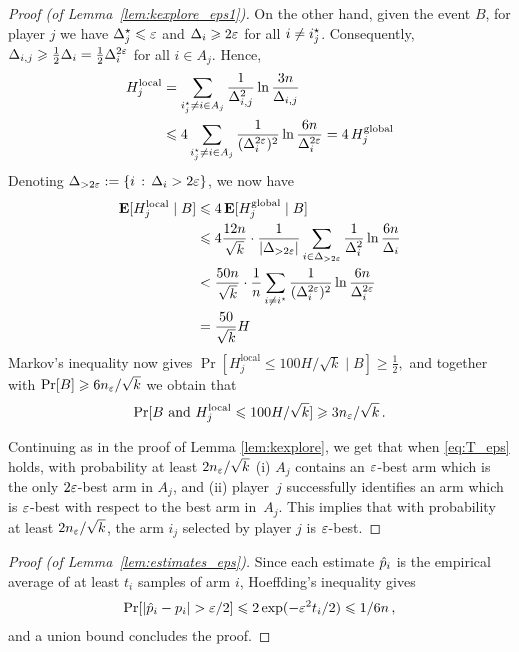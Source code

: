 \documentclass{article}
\begin{document}
\begin{proof}[Proof (of Lemma~\ref{lem:kexplore_eps1})]
On the other hand, given the event $B$, for player $j$ we have $\Delta_j^\star \leqslant \varepsilon$ and $\Delta_i \geqslant 2\varepsilon$ for all $i \ne i_j^\star$.
Consequently, $\Delta_{i,j} \geqslant \tfrac{1}{2} \Delta_i =  \tfrac{1}{2} \Delta_i^{2\varepsilon}$ for all $i \in A_j$.
Hence,
\begin{align*}
	H_j^\text{local}
	&= \sum_{i^\star_j \ne i \in A_j} \frac{1}{\Delta_{i,j}^2} \ln \frac{3n}{\Delta_{i,j}} \\
	&\leqslant 4 \sum_{i^\star_j \ne i \in A_j} \frac{1}{(\Delta_i^{2\varepsilon})^2} \ln \frac{6n}{\Delta_i^{2\varepsilon}}
	= 4 \, H_j^\text{global}
\end{align*}
Denoting $\Delta_{> 2\varepsilon} := \{i \,:\, \Delta_i > 2\varepsilon\}$, we now have 
\begin{align*}
	\mathbf{E}[H_j^\text{local} \mid B]
	&\leqslant 4 \, \mathbf{E}[H_j^\text{global} \mid B] \\
	&\leqslant 4 \frac{12n}{\sqrt{k}} \cdot 
		\frac{1}{|\Delta_{>2\varepsilon}|} 
			\sum_{i \in \Delta_{>2\varepsilon}} \frac{1}{\Delta_i^2} \ln \frac{6n}{\Delta_i} \\
	&< \frac{50n}{\sqrt{k}} \cdot 
		\frac{1}{n} \sum_{i \ne i^\star} \frac{1}{(\Delta_i^{2\varepsilon})^2} \ln \frac{6n}{\Delta_i^{2\varepsilon}} \\
	&= \frac{50}{\sqrt{k}} H
\end{align*}
Markov's inequality now gives
$
	\Pr[H_j^\text{local} \le 100 H/\sqrt{k} \mid B]
	\ge \tfrac{1}{2} ,
$
and together with $\Pr[B] \geqslant 6 n_{\varepsilon} / \sqrt{k}$ we obtain that
\begin{align*}
	\Pr[B \mbox{ and } H_j^\text{local} \leqslant 100 H/\sqrt{k} ]
	\geqslant 3 n_{\varepsilon} / \sqrt{k} \,.
\end{align*}

Continuing as in the proof of Lemma \ref{lem:kexplore}, we get that when \eqref{eq:T_eps} holds, with probability at least $2 n_{\varepsilon} / \sqrt{k}$
(i) $A_j$ contains an $\varepsilon$-best arm which is the only $2\varepsilon$-best arm in $A_j$, and
(ii) player~$j$ successfully identifies an arm which is $\varepsilon$-best with respect to the best arm in~$A_j$. 
This implies that with probability at least $2 n_{\varepsilon} / \sqrt{k}$, the arm $i_j$ selected by player $j$ is $\varepsilon$-best.
\end{proof}



\begin{proof}[Proof (of Lemma~\ref{lem:estimates_eps})]
Since each estimate $\hat{p}_i$ is the empirical average of at least $t_i$ samples of arm $i$,
Hoeffding's inequality gives
\begin{align*}
	\Pr[|\hat{p}_i - p_i| > \varepsilon/2]
	\leqslant 2 \exp (-\varepsilon^2 t_i/2)
	\leqslant 1/6n \,,
\end{align*}
and a union bound concludes the proof.
\end{proof}
\end{document}
